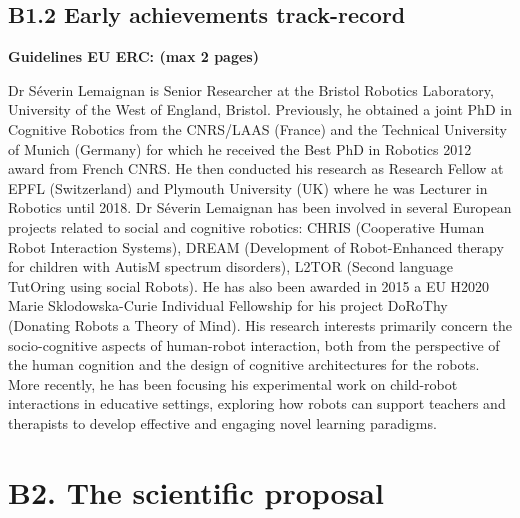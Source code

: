 \documentclass[11pt]{article}
\newcommand{\eu}[1]{{\color{teal}\textbf{Guidelines EU ERC: #1}}}
\begin{document}
\subsection{B1.2 Early achievements track-record}\label{early-achievements-track-record}

\eu{(max 2 pages)}

Dr Séverin Lemaignan is Senior Researcher at the Bristol Robotics
Laboratory, University of the West of England, Bristol. Previously, he
obtained a joint PhD in Cognitive Robotics from the CNRS/LAAS (France)
and the Technical University of Munich (Germany) for which he received
the Best PhD in Robotics 2012 award from French CNRS. He then conducted
his research as Research Fellow at EPFL (Switzerland) and Plymouth
University (UK) where he was Lecturer in Robotics until 2018. Dr Séverin
Lemaignan has been involved in several European projects related to
social and cognitive robotics: CHRIS (Cooperative Human Robot
Interaction Systems), DREAM (Development of Robot-Enhanced therapy for
children with AutisM spectrum disorders), L2TOR (Second language
TutOring using social Robots). He has also been awarded in 2015 a EU
H2020 Marie Sklodowska-Curie Individual Fellowship for his project
DoRoThy (Donating Robots a Theory of Mind). His research interests
primarily concern the socio-cognitive aspects of human-robot
interaction, both from the perspective of the human cognition and the
design of cognitive architectures for the robots. More recently, he has
been focusing his experimental work on child-robot interactions in
educative settings, exploring how robots can support teachers and
therapists to develop effective and engaging novel learning paradigms.
















\newpage

\section{B2. The scientific proposal}\label{part-b2-the-scientific-proposal}
\end{document}
